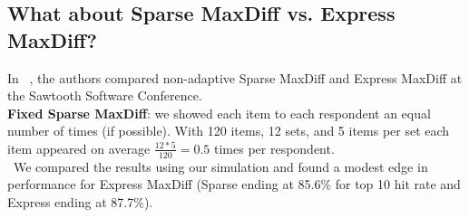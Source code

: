 \documentclass[nonblindrev]{informs3}
\begin{document}



\subsection{What about Sparse MaxDiff vs. Express MaxDiff?}
In ~\cite{wirth2012largeset}, the authors compared non-adaptive Sparse MaxDiff and Express MaxDiff at the Sawtooth Software Conference.\\
\textbf{Fixed Sparse MaxDiff}: we showed each item to each respondent an equal number of times (if possible).  With 120 items, 12 sets, and 5 items per set each item appeared on average $\frac{12*5}{120} = 0.5$ times per respondent. \\
 We compared the results using our simulation and found a modest edge in performance for Express MaxDiff (Sparse ending at 85.6\% for top 10 hit rate and Express ending at 87.7\%).
\end{document}
